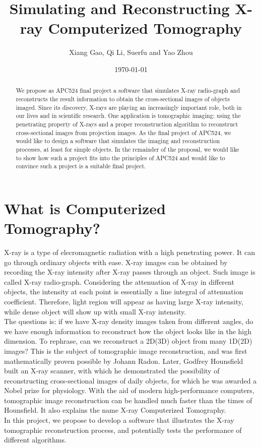 \documentclass[11]{article}
\title{Simulating and Reconstructing X-ray Computerized Tomography}
\author{Xiang Gao, Qi Li, Suerfu and Yao Zhou}
\date{\today}
\begin{document}
	\maketitle
	
\begin{abstract}
	We propose as APC524 final project a software that simulates X-ray radio-graph and reconstructs the result information to obtain the cross-sectional images of objects imaged. Since its discovery, X-rays are playing an increasingly important role, both in our lives and in scientific research. One application is tomographic imaging: using the penetrating property of X-rays and a proper reconstruction algorithm to reconstruct cross-sectional images from projection images. As the final project of APC524, we would like to design a software that simulates the imaging and reconstruction processes, at least for simple objects. In the remainder of the proposal, we would like to show how such a project fits into the principles of APC524 and would like to convince such a project is a suitable final project.
\end{abstract}

\section{What is Computerized Tomography?}
	X-ray is a type of elecromagnetic radiation with a high penetrating power. It can go through ordinary objects with ease. X-ray images can be obtained by recording the X-ray intensity after X-ray passes through an object. Such image is called X-ray radio-graph. Considering the attenuation of X-ray in different objects, the intensity at each point is essentially a line integral of attenuation coefficient. Therefore, light region will appear as having large X-ray intensity, while dense object will show up with small X-ray intensity.\\
	The questions is: if we have X-ray density images taken from different angles, do we have enough information to reconstruct how the object looks like in the high dimension. To rephrase, can we reconstruct a 2D(3D) object from many 1D(2D) images? This is the subject of tomographic image reconstruction, and was first mathematically proven possible by Johann Radon. Later, Godfrey Hounsfield built an X-ray scanner, with which he demonstrated the possibility of reconstructing cross-sectional images of daily objects, for which he was awarded a Nobel prize for physiology. With the aid of modern high-performance computers, tomographic image reconstruction can be handled much faster than the times of Hounsfield. It also explains the name X-ray Computerized Tomography.
\\
	In this project, we propose to develop a software that illustrates the X-ray tomographic reconstruction process, and potentially tests the performance of different algorithms.  
\end{document}
